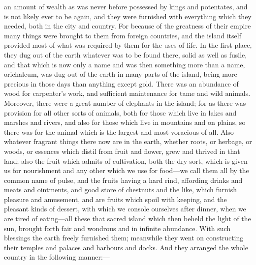 \documentclass[11pt,letter]{article}
\begin{document}
an amount of wealth as was never before possessed by kings and potentates, and is not likely ever to be again, and they were furnished with everything which they needed, both in the city and country. For because of the greatness of their empire many things were brought to them from foreign countries, and the island itself provided most of what was required by them for the uses of life. In the first place, they dug out of the earth whatever was to be found there, solid as well as fusile, and that which is now only a name and was then something more than a name, orichalcum, was dug out of the earth in many parts of the island, being more precious in those days than anything except gold. There was an abundance of wood for carpenter's work, and sufficient maintenance for tame and wild animals. Moreover, there were a great number of elephants in the island; for as there was provision for all other sorts of animals, both for those which live in lakes and marshes and rivers, and also for those which live in mountains and on plains, so there was for the animal which is the largest and most voracious of all. Also whatever fragrant things there now are in the earth, whether roots, or herbage, or woods, or essences which distil from fruit and flower, grew and thrived in that land; also the fruit which admits of cultivation, both the dry sort, which is given us for nourishment and any other which we use for food—we call them all by the common name of pulse, and the fruits having a hard rind, affording drinks and meats and ointments, and good store of chestnuts and the like, which furnish pleasure and amusement, and are fruits which spoil with keeping, and the pleasant kinds of dessert, with which we console ourselves after dinner, when we are tired of eating—all these that sacred island which then beheld the light of the sun, brought forth fair and wondrous and in infinite abundance. With such blessings the earth freely furnished them; meanwhile they went on constructing their temples and palaces and harbours and docks. And they arranged the whole country in the following manner:—
\end{document}
